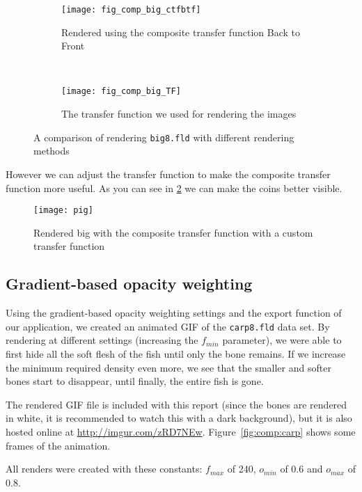\begin{figure}[H]
	\ContinuedFloat
	\centering
	\begin{subfigure}[t]{0.45\textwidth}
		\texttt{[image: fig\_comp\_big\_ctfbtf]}
		\caption{Rendered using the composite transfer function Back to Front}
	\end{subfigure}
	~%
	\begin{subfigure}[t]{0.45\textwidth}
		\texttt{[image: fig\_comp\_big\_TF]}
		\caption{The transfer function we used for rendering the images}
	\end{subfigure}
	
	\caption{A comparison of rendering \texttt{big8.fld} with different rendering methods}
	\label{fig:comp:big}
\end{figure}	
However we can adjust the transfer function to make the composite transfer function more useful.
As you can see in \ref{fig:comp:biggie} we can make the coins better visible.
\begin{figure}[H]
	\centering
		\texttt{[image: pig]}
		\caption{Rendered big with the composite transfer function with a custom transfer function}
	\label{fig:comp:biggie}
\end{figure}
\subsection{Gradient-based opacity weighting}
Using the gradient-based opacity weighting settings and the export function of our application, we created an animated GIF of the \texttt{carp8.fld} data set.
By rendering at different settings (increasing the $f_{min}$ parameter), we were able to first hide all the soft flesh of the fish until only the bone remains.
If we increase the minimum required density even more, we see that the smaller and softer bones start to disappear, until finally, the entire fish is gone.

The rendered GIF file is included with this report (since the bones are rendered in white, it is recommended to watch this with a dark background), but it is also hosted online at \url{http://imgur.com/zRD7NEw}.
Figure~\ref{fig:comp:carp} shows some frames of the animation.

All renders were created with these constants: $f_{max}$ of 240, $o_{min}$ of $0.6$ and $o_{max}$ of $0.8$.

